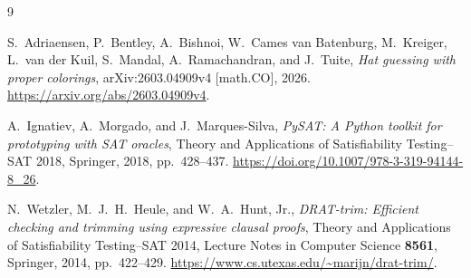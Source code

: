 \begin{thebibliography}{9}

S.~Adriaensen, P.~Bentley, A.~Bishnoi, W.~Cames van Batenburg,
M.~Kreiger, L.~van der Kuil, S.~Mandal, A.~Ramachandran, and J.~Tuite,
\emph{Hat guessing with proper colorings},
arXiv:2603.04909v4 [math.CO], 2026.
\url{https://arxiv.org/abs/2603.04909v4}.

A.~Ignatiev, A.~Morgado, and J.~Marques-Silva,
\emph{PySAT: A Python toolkit for prototyping with SAT oracles},
Theory and Applications of Satisfiability Testing--SAT 2018,
Springer, 2018,
pp.~428--437.
\url{https://doi.org/10.1007/978-3-319-94144-8_26}.

N.~Wetzler, M.~J.~H.~Heule, and W.~A.~Hunt, Jr.,
\emph{DRAT-trim: Efficient checking and trimming using expressive clausal proofs},
Theory and Applications of Satisfiability Testing--SAT 2014,
Lecture Notes in Computer Science \textbf{8561}, Springer, 2014,
pp.~422--429.
\url{https://www.cs.utexas.edu/~marijn/drat-trim/}.

\end{thebibliography}
